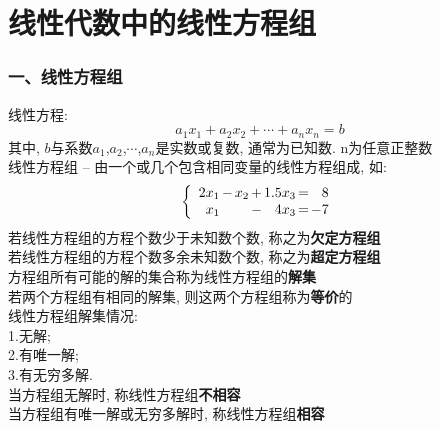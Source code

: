 \documentclass[UTF8,fontset=ubuntu]{ctexart}
\theoremstyle{plain}
\theoremstyle{nonumberplain}
\theoremstyle{empty}
\begin{document}
\part{线性代数中的线性方程组}
\section{一、线性方程组}
线性方程:
	\[ a_{1}x_{1}+a_{2}x_{2}+\cdots +a_{n}x_{n}=b \]
其中, $b$与系数$a_{1}$,$a_{2}$,$\cdots$,$a_{n}$是实数或复数, 通常为已知数. n为任意正整数\\[2ex]

线性方程组 -- 由一个或几个包含相同变量的线性方程组成, 如:
\[\left\{\begin{array}{r@{\hspace{1.5pt}}l@{\hspace{1.5pt}}r@{\hspace{1.5pt}}l@{\hspace{1.5pt}}r@{\hspace{1.5pt}}l@{\hspace{1.5pt}}r}
	2x_1 & - & x_2 & + & 1.5x_3 & = & 8\\
	x_1  &   &     & - & 4x_3   & = & -7		
\end{array}\right.\]
若线性方程组的方程个数少于未知数个数, 称之为\textbf{欠定方程组}\\
若线性方程组的方程个数多余未知数个数, 称之为\textbf{超定方程组}\\
方程组所有可能的解的集合称为线性方程组的\textbf{解集}\\
若两个方程组有相同的解集, 则这两个方程组称为\textbf{等价}的\\[2ex]

线性方程组解集情况:\\
1.无解;\\
2.有唯一解;\\
3.有无穷多解.\\[1ex]
当方程组无解时, 称线性方程组\textbf{不相容}\\
当方程组有唯一解或无穷多解时, 称线性方程组\textbf{相容}\\[2ex]
\end{document}
